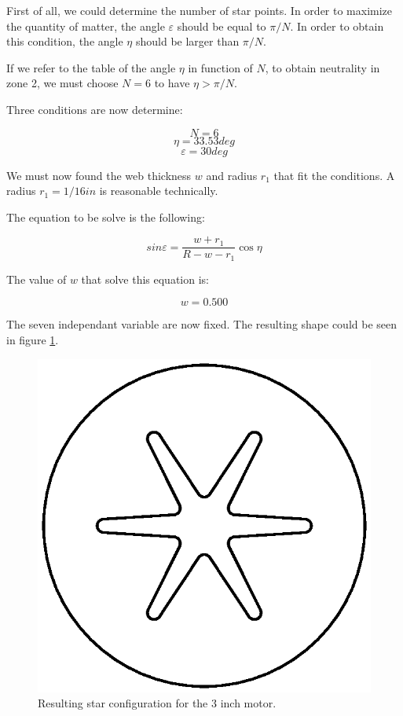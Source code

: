 \documentclass[11pt, titlepage]{article}
\begin{document}

  First of all, we could determine the number of star points. In order
  to maximize the quantity of matter, the angle $\varepsilon$ should
  be equal to $\pi/N$. In order to obtain this condition, the angle
  $\eta$ should be larger than $\pi/N$. 

  If we refer to the table of the angle $\eta$ in function of $N$, to
  obtain neutrality in zone 2, we must choose $N=6$ to have $\eta >
  \pi/N$.

  Three conditions are now determine:

$$N = 6$$
$$\eta = 33.53 deg$$
$$\varepsilon = 30 deg$$

  We must now found the web thickness $w$ and radius $r_1$ that fit
  the conditions. A radius $r_1 = 1/16 in$ is reasonable technically.

  The equation to be solve is the following:

$$sin{\varepsilon} = \frac{w+r_1}{R-w-r_1}\cos{\eta}$$

  The value of $w$ that solve this equation is:

$$w = 0.500$$

  The seven independant variable are now fixed. The resulting shape
  could be seen in figure \ref{res}.


\begin{figure}
 \begin{center}
 \includegraphics[]{img/res.ps}
      \caption{Resulting star configuration for the 3 inch motor.}\label{res}
 \end{center}
\end{figure}
\end{document}

